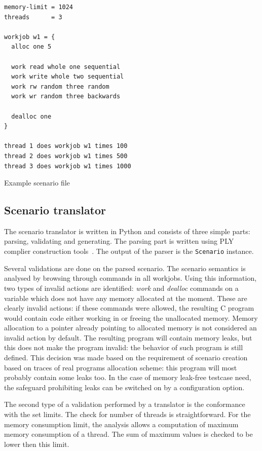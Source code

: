\begin{table}[h]
\begin{center}
\begin{lstlisting}[frame=single]
memory-limit = 1024
threads      = 3

workjob w1 = {
  alloc one 5

  work read whole one sequential
  work write whole two sequential
  work rw random three random
  work wr random three backwards

  dealloc one
}

thread 1 does workjob w1 times 100
thread 2 does workjob w1 times 500
thread 3 does workjob w1 times 1000
\end{lstlisting}
\caption{Example scenario file}
\label{scenario-sample}
\end{center}
\end{table} 

\subsection{Scenario translator}
The scenario translator is written in Python and consists of three simple parts:
parsing, validating and generating. The parsing part is written using PLY
complier construction tools~\cite{python-ply}. The output of the parser is the
{\tt Scenario} instance.

Several validations are done on the parsed scenario. The scenario semantics is
analysed by browsing through commands in all workjobs. Using this information,
two types of invalid actions are identified: {\em work} and {\em dealloc}
commands on a variable which does not have any memory allocated at the moment.
These are clearly invalid actions: if these commands were allowed, the resulting
C program would contain code either working in or freeing the unallocated
memory. Memory allocation to a pointer already pointing to allocated memory is
not considered an invalid action by default. The resulting program will contain
memory leaks, but this does not make the program invalid: the behavior of such
program is still defined. This decision was made based on the requirement of
scenario creation based on traces of real programs allocation scheme: this
program will most probably contain some leaks too. In the case of memory
leak-free testcase need, the safeguard prohibiting leaks can be switched on by a
configuration option.

The second type of a validation performed by a translator is the conformance
with the set limits. The check for number of threads is straightforward. For the
memory consumption limit, the analysis allows a computation of maximum memory
consumption of a thread. The sum of maximum values is checked to be lower
then this limit.

